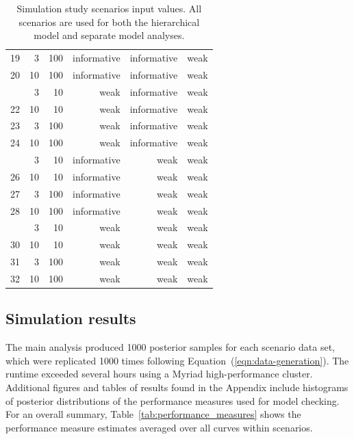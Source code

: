 \documentclass[AMA,STIX1COL]{WileyNJD-v2}
\begin{document}
\begin{table}[htbp!]
\begin{tabular}{rrrrrr}
19 & 3 & 100 & informative & informative & weak\\
20 & 10 & 100 & informative & informative & weak\\
\addlinespace
21 & 3 & 10 & weak & informative & weak\\
22 & 10 & 10 & weak & informative & weak\\
23 & 3 & 100 & weak & informative & weak\\
24 & 10 & 100 & weak & informative & weak\\
\addlinespace
25 & 3 & 10 & informative & weak & weak\\
26 & 10 & 10 & informative & weak & weak\\
27 & 3 & 100 & informative & weak & weak\\
28 & 10 & 100 & informative & weak & weak\\
\addlinespace
29 & 3 & 10 & weak & weak & weak\\
30 & 10 & 10 & weak & weak & weak\\
31 & 3 & 100 & weak & weak & weak\\
32 & 10 & 100 & weak & weak & weak\\
\bottomrule
\end{tabular}
\caption{Simulation study scenarios input values. All scenarios are used for both the hierarchical model and separate model analyses.}
\label{tab:scenarios}
\end{table}


\subsection{Simulation results}
The main analysis produced 1000 posterior samples for each scenario data set, which were replicated 1000 times following Equation~(\ref{eqn:data-generation}). The runtime exceeded several hours using a Myriad high-performance cluster. Additional figures and tables of results found in the Appendix include histograms of posterior distributions of the performance measures used for model checking.
For an overall summary, Table~\ref{tab:performance_measures} shows the performance measure estimates averaged over all curves within scenarios.

\end{document}
